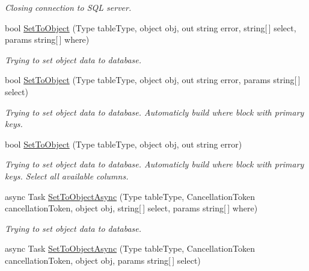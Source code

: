 \begin{DoxyCompactItemize}
\begin{DoxyCompactList}\small\item\em Closing connection to S\+QL server. \end{DoxyCompactList}\item 
bool \mbox{\hyperlink{class_uniform_data_operator_1_1_sql_1_1_my_sql_1_1_my_sql_data_operator_a8f44635dc337c3652041f079190a792d}{Set\+To\+Object}} (Type table\+Type, object obj, out string error, string\mbox{[}$\,$\mbox{]} select, params string\mbox{[}$\,$\mbox{]} where)
\begin{DoxyCompactList}\small\item\em Trying to set object data to database. \end{DoxyCompactList}\item 
bool \mbox{\hyperlink{class_uniform_data_operator_1_1_sql_1_1_my_sql_1_1_my_sql_data_operator_af763205fa1d8a8ad83afc672d5743d65}{Set\+To\+Object}} (Type table\+Type, object obj, out string error, params string\mbox{[}$\,$\mbox{]} select)
\begin{DoxyCompactList}\small\item\em Trying to set object data to database. Automaticly build where block with primary keys. \end{DoxyCompactList}\item 
bool \mbox{\hyperlink{class_uniform_data_operator_1_1_sql_1_1_my_sql_1_1_my_sql_data_operator_a5da5cc531c8c953f73e7fc50513790e9}{Set\+To\+Object}} (Type table\+Type, object obj, out string error)
\begin{DoxyCompactList}\small\item\em Trying to set object data to database. Automaticly build where block with primary keys. Select all available columns. \end{DoxyCompactList}\item 
async Task \mbox{\hyperlink{class_uniform_data_operator_1_1_sql_1_1_my_sql_1_1_my_sql_data_operator_a98b579ed4a87c3f9dbdb90ffc28bf15c}{Set\+To\+Object\+Async}} (Type table\+Type, Cancellation\+Token cancellation\+Token, object obj, string\mbox{[}$\,$\mbox{]} select, params string\mbox{[}$\,$\mbox{]} where)
\begin{DoxyCompactList}\small\item\em Trying to set object data to database. \end{DoxyCompactList}\item 
async Task \mbox{\hyperlink{class_uniform_data_operator_1_1_sql_1_1_my_sql_1_1_my_sql_data_operator_a49ee22a2a69fbc0752c989c7b79e5e43}{Set\+To\+Object\+Async}} (Type table\+Type, Cancellation\+Token cancellation\+Token, object obj, params string\mbox{[}$\,$\mbox{]} select)

\end{DoxyCompactItemize}
